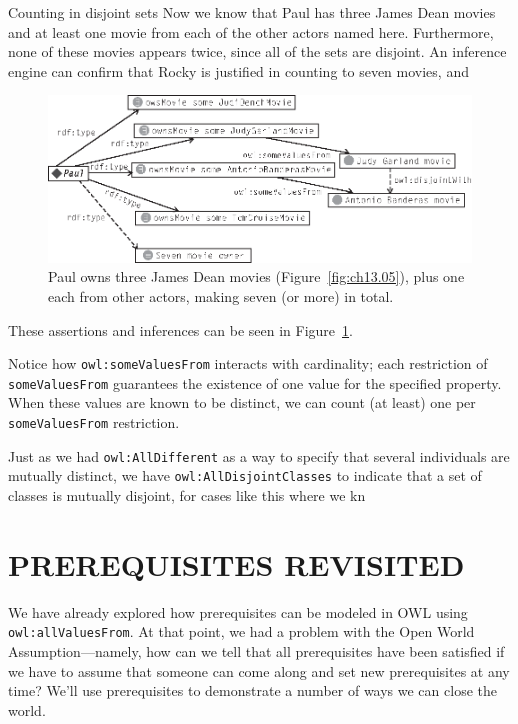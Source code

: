 \begin{challenge}{Counting in disjoint sets}
Now we know that Paul has three James Dean movies and at least one movie
from each of the other actors named here. Furthermore, none of these
movies appears twice, since all of the sets are disjoint. An inference
engine can confirm that Rocky is justified in counting to seven movies,
and

\begin{figure}
\centering
\includegraphics[width=5in]{media/ch13/f13-06.eps}
\caption{Paul owns three James Dean movies (Figure~\ref{fig:ch13.05}), plus one each from
other actors, making seven (or more) in total.}
\label{fig:ch13.06}
\end{figure}


These assertions and inferences can be seen in Figure~\ref{fig:ch13.06}.
\end{challenge}


Notice how \texttt{owl:someValuesFrom} interacts with cardinality; each
restriction of \texttt{someValuesFrom} guarantees the existence of one value for
the specified property. When these values are known to be distinct, we
can count (at least) one per \texttt{someValuesFrom} restriction.

Just as we had \texttt{owl:AllDifferent} as a way to specify that several
individuals are mutually distinct, we have \texttt{owl:AllDisjointClasses} to indicate that a set of classes is mutually disjoint, for cases like this where we kn



\section{PREREQUISITES REVISITED}

We have already explored how prerequisites can be modeled in OWL using
\texttt{owl:allValuesFrom}. At that point, we had a problem with the Open World
Assumption---namely, how can we tell that all prerequisites have been
satisfied if we have to assume that someone can come along and set new
prerequisites at any time? We'll use prerequisites to demonstrate a
number of ways we can close the world.

